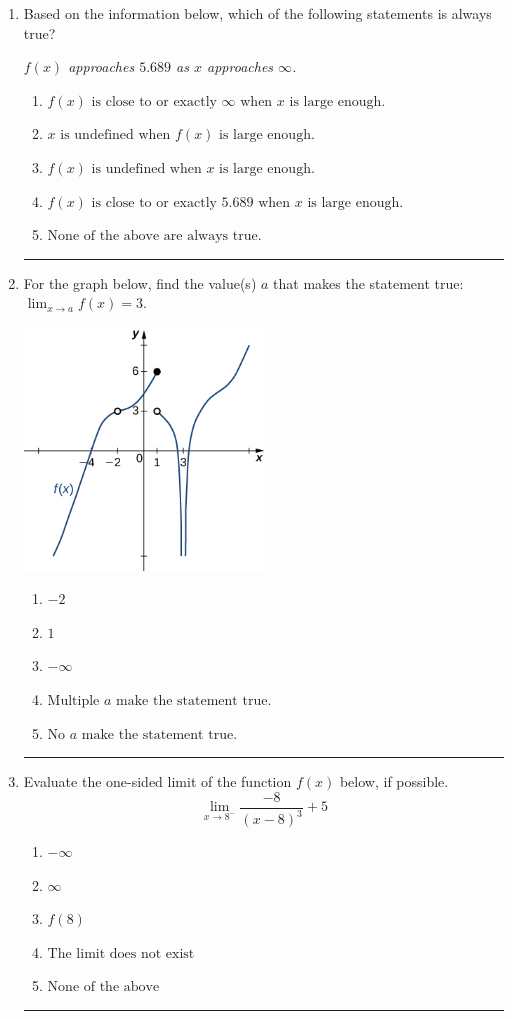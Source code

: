 \documentclass[14pt]{extbook}
\newcommand{\litem}[1]{\item#1\hspace*{-1cm}\rule{\textwidth}{0.4pt}}
\begin{document}
\begin{enumerate}
{\begin{enumerate}[label=\Alph*.]
\end{enumerate} }
\litem{
Based on the information below, which of the following statements is always true?
\begin{center}
    \textit{ $f(x)$ approaches $5.689$ as $x$ approaches $\infty$. }
\end{center}
\begin{enumerate}[label=\Alph*.]
\item \( f(x) \text{ is close to or exactly } \infty \text{ when } x \text{ is large enough}. \)
\item \( x \text{ is undefined when } f(x) \text{ is large enough}. \)
\item \( f(x) \text{ is undefined when } x \text{ is large enough}. \)
\item \( f(x) \text{ is close to or exactly } 5.689 \text{ when } x \text{ is large enough}. \)
\item \( \text{None of the above are always true.} \)

\end{enumerate} }
\litem{
For the graph below, find the value(s) $a$ that makes the statement true: $ \displaystyle \lim_{x \rightarrow a} f(x) = 3$.
\begin{center}
    \includegraphics[width=0.5\textwidth]{../Figures/evaluateLimitGraphicallyB.png}
\end{center}
\begin{enumerate}[label=\Alph*.]
\item \( -2 \)
\item \( 1 \)
\item \( -\infty \)
\item \( \text{Multiple } a \text{ make the statement true}. \)
\item \( \text{No } a \text{ make the statement true}. \)

\end{enumerate} }
\litem{
Evaluate the one-sided limit of the function $f(x)$ below, if possible.\[ \lim_{x \rightarrow 8^-} \frac{-8}{(x-8)^3}+5 \]\begin{enumerate}[label=\Alph*.]
\item \( -\infty \)
\item \( \infty \)
\item \( f(8) \)
\item \( \text{The limit does not exist} \)
\item \( \text{None of the above} \)


\end{enumerate}}
\end{enumerate}
\end{document}
